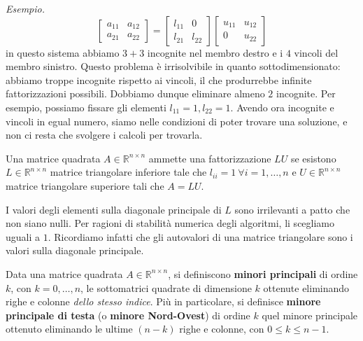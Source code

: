\textit{Esempio.}
\begin{equation*}
\begin{bmatrix}
a_{11} & a_{12}\\
a_{21} & a_{22}
\end{bmatrix} =\begin{bmatrix}
l_{11} & 0\\
l_{21} & l_{22}
\end{bmatrix}\begin{bmatrix}
u_{11} & u_{12}\\
0 & u_{22}
\end{bmatrix}
\end{equation*}
in questo sistema abbiamo $\displaystyle 3+3$ incognite nel membro destro e i $\displaystyle 4$ vincoli del membro sinistro. Questo problema è irrisolvibile in quanto sottodimensionato: abbiamo troppe incognite rispetto ai vincoli, il che produrrebbe infinite fattorizzazioni possibili.
Dobbiamo dunque eliminare almeno $2$ incognite.
Per esempio, possiamo fissare gli elementi $\displaystyle l_{11} =1,l_{22} =1$.
Avendo ora incognite e vincoli in egual numero, siamo nelle condizioni di poter trovare una soluzione, e non ci resta che svolgere i calcoli per trovarla.
\begin{definition}
Una matrice quadrata $\displaystyle A\in \mathbb{R}^{n\times n}$ ammette una fattorizzazione $\displaystyle LU$ se esistono $\displaystyle L\in \mathbb{R}^{n\times n}$ matrice triangolare inferiore tale che $\displaystyle l_{ii} =1\ \forall i=1,\dotsc ,n$ e $\displaystyle U\in \mathbb{R}^{n\times n}$ matrice triangolare superiore tali che $\displaystyle A=LU$.
\end{definition}
I valori degli elementi sulla diagonale principale di $\displaystyle L$ sono irrilevanti a patto che non siano nulli.
Per ragioni di stabilità numerica degli algoritmi, li scegliamo uguali a $\displaystyle 1$.
Ricordiamo infatti che gli autovalori di una matrice triangolare sono i valori sulla diagonale principale.
\begin{definition}
Data una matrice quadrata $A \in \mathbb{R}^{n\times n}$, si definiscono \textbf{minori principali} di ordine $k$, con $k=0,\dots,n$, le sottomatrici quadrate di dimensione $k$ ottenute eliminando righe e colonne \emph{dello stesso indice}. Più in particolare, si definisce \textbf{minore principale di testa} (o \textbf{minore Nord-Ovest}) di ordine $k$ quel minore principale ottenuto eliminando le ultime $(n-k)$ righe e colonne, con $0\le k\le n-1$.
\end{definition}
